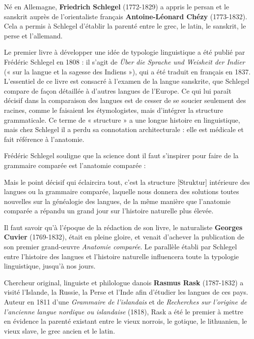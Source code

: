 Né en Allemagne, \textbf{Friedrich Schlegel} (1772-1829) a appris le persan et le sanskrit auprès de l’orientaliste français \textbf{Antoine-Léonard Chézy} (1773-1832). Cela a permis à Schlegel d’établir la parenté entre le grec, le latin, le sanskrit, le perse et l’allemand.

Le premier livre à développer une idée de typologie linguistique a été publié par Frédéric Schlegel en 1808 : il s’agit de \textit{Über die Sprache und Weisheit der Indier} (« sur la langue et la sagesse des Indiens »), qui a été traduit en français en 1837. L’essentiel de ce livre est consacré à l’examen de la langue sanskrite, que Schlegel compare de façon détaillée à d’autres langues de l’Europe. Ce qui lui paraît décisif dans la comparaison des langues est de cesser de se soucier seulement des racines, comme le faisaient les étymologistes, mais d’intégrer la structure grammaticale. Ce terme de « structure » a une longue histoire en linguistique, mais chez Schlegel il a perdu sa connotation architecturale : elle est médicale et fait référence à l’anatomie.

Frédéric Schlegel souligne que la science dont il faut s’inspirer pour faire de la grammaire comparée est l’anatomie comparée :
\begin{lecture}{}
Mais le point décisif qui éclaircira tout, c’est la structure [Struktur] intérieure des langues ou la grammaire comparée, laquelle nous donnera des solutions toutes nouvelles sur la généalogie des langues, de la même manière que l’anatomie comparée a répandu un grand jour sur l’histoire naturelle plus élevée.
\end{lecture}
Il faut savoir qu’à l’époque de la rédaction de son livre, le naturaliste \textbf{Georges Cuvier} (1769-1832), était en pleine gloire, et venait d’achever la publication de son premier grand-œuvre \textit{Anatomie comparée}. Le parallèle établi par Schlegel entre l’histoire des langues et l’histoire naturelle influencera toute la typologie linguistique, jusqu’à nos jours.

Chercheur original, linguiste et philologue danois \textbf{Rasmus Rask} (1787-1832) a visité l’Islande, la Russie, la Perse et l’Inde afin d’étudier les langues de ces pays. Auteur en 1811 d’une \textit{Grammaire de l’islandais} et de \textit{Recherches sur l’origine de l’ancienne langue nordique ou islandaise} (1818),
Rask a été le premier à mettre en évidence la parenté existant entre le vieux norrois, le gotique, le lithuanien, le vieux slave, le grec ancien et le latin.


